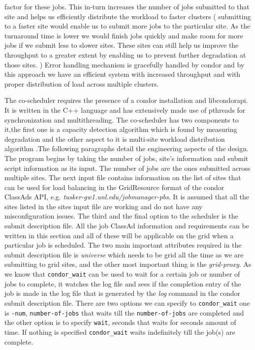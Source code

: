 \documentclass[ms,electronic,double]{nuthesis}
\begin{document}
 factor for these jobs. This in-turn increases the number of jobs submitted to that site and helps us efficiently distribute 
 the workload to faster clusters ( submitting to a faster site would enable us to submit 
 more jobs to the particular site. As the turnaround time is lower we would finish jobs quickly and make room for more
 jobs if we submit less to slower sites. These sites can still help us improve the throughput to a greater extent by enabling us to 
 prevent further degradation at those sites.
  ) 
  Error handling mechanism is gracefully handled by 
 condor and by this approach we have an efficient system with increased throughput and with proper distribution
  of load across multiple clusters.  
        
 
 
 


The co-scheduler requires the presence of a condor installation and libcondorapi.
It is written in the C++ language and has extensively made use of pthreads for 
synchronization and multithreading. The co-scheduler has two components to it,the first one is a capacity detection
algorithm which is found by measuring degradation and the other aspect to it is 
multi-site workload distribution algorithm .The following paragraphs detail the 
engineering aspects of the design.
The program begins by taking the number of jobs, site's information and submit script 
information as its input. The number of jobs are the ones submitted across 
multiple sites. The next input file contains information on the list of sites that can be used 
for load balancing in the GridResource format of the condor ClassAds API, e.g. \emph{tusker-gw1.unl.edu/jobmanager-pbs}.
It is assumed that all the sites listed in the sites input file are working and 
do not have any misconfiguration issues. The third and the final option to the 
scheduler is the submit description file. All the job ClassAd information and 
requirements can be written in this section and all of these will be applicable on the grid when a particular job is 
scheduled. The two main important attributes required in the submit description 
file is \emph{universe} which needs to be grid all the time as we are submitting 
to grid sites, and the other most important thing is the 
\emph{grid-proxy}. 
As we know that \texttt{condor\_wait} \cite{manual56}can be used to wait for a certain job or 
number of jobs to complete, it watches the log file and sees if the completion 
entry of the job is made in the log file that is generated by the \emph{log} 
command in the condor submit description file. There are two options we can 
specify to \texttt{condor\_wait} one is \texttt{-num}, \texttt{number-of-jobs} that waits
till the \texttt{number-of-jobs} are completed and the other option is to specify \texttt{wait}, seconds that 
waits for seconds amount of time. If nothing is specified \texttt{condor\_wait} waits indefinitely till
the job(s) are complete.
\end{document}
